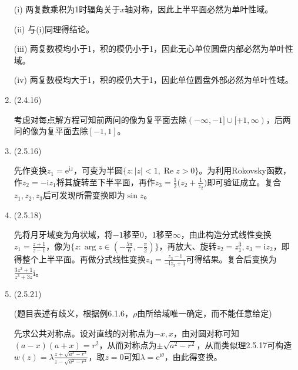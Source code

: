\documentclass[a4paper,UTF8,fontset=windows]{ctexart}
\DeclareMathOperator{\re}{Re}
\begin{document}
\begin{enumerate}
    (i) 两复数乘积为1时辐角关于$x$轴对称，因此上半平面必然为单叶性域。
    
    (ii) 与(i)同理得结论。
    
    (iii) 两复数模均小于1，积的模仍小于1，因此无心单位圆盘内部必然为单叶性域。
    
    (iv) 两复数模均大于1，积的模仍大于1，因此单位圆盘外部必然为单叶性域。
    
    \item (2.4.16)
    
    考虑对每点解方程可知前两问的像为复平面去除$(-\infty,-1]\cup[+1,\infty)$，后两问的像为复平面去除$[-1,1]$。
    
    \item (2.5.16)
    
    先作变换$z_1=\mathrm{e}^{\mathrm{i}z}$，可变为半圆$\{z:|z|<1,\re{z}>0\}$。为利用Rokovsky函数，作$z_2=-\mathrm{i}z_1$将其旋转至下半平面，再作$z_3=\frac{1}{2}\big(z_2+\frac{1}{z_2}\big)$即可验证成立。复合$z_1,z_2,z_3$后可发现所需变换即为$\sin z$。
    
    \item (2.5.18)
    
    先将月牙域变为角状域，将$-1$移至0，1移至$\infty$，由此构造分式线性变换$z_1=\frac{z+1}{z-1}$，像为$\{z:\arg z\in(-\frac{5\pi}{6},-\frac{\pi}{2})\}$，再放大、旋转$z_2=z_1^3,z_3=\mathrm{i}z_2$，即得整个上半平面。再做分式线性变换$z_4=\frac{z_3-\mathrm{i}}{-\mathrm{i}z_3+1}$可得结果。复合后变换为$\frac{3z^2+1}{z^3+3z}\mathrm{i}$。
    
    \item (2.5.21)
    
    (题目表述有歧义，根据例6.1.6，$\rho$由所给域唯一确定，而不能任意给定)
    
    先求公共对称点。设对直线的对称点为$-x,x$，由对圆对称可知$(a-x)(a+x)=r^2$，从而对称点为$\pm\sqrt{a^2-r^2}$，从而类似理2.5.17可构造$w(z)=\lambda\frac{z+\sqrt{a^2-r^2}}{z-\sqrt{a^2-r^2}}$，取$z=0$可知$\lambda=\mathrm{e}^{\mathrm{i}\theta}$，由此得变换。
\end{enumerate}
\end{document}
